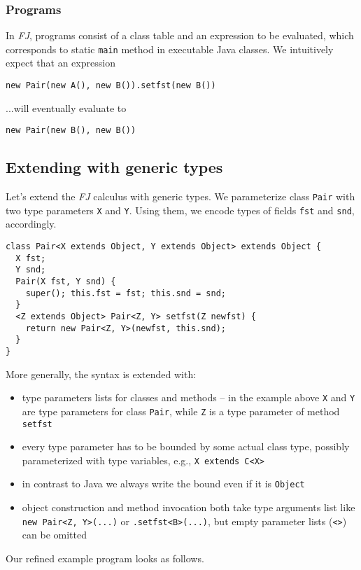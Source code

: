 \documentclass{article}[12pt]
\begin{document}
\subsubsection{Programs}

In \emph{FJ}, programs consist of a class table and an expression
to be evaluated, which corresponds to static \texttt{main} method in
executable Java classes. We intuitively expect that an expression

\begin{verbatim}
new Pair(new A(), new B()).setfst(new B())
\end{verbatim}
...will eventually evaluate to
\begin{verbatim}
new Pair(new B(), new B())
\end{verbatim}


\subsection{Extending with generic types}

Let's extend the \emph{FJ} calculus with generic types. We parameterize
class \texttt{Pair} with two type parameters \texttt{X} and \texttt{Y}.
Using them, we encode types of fields \texttt{fst} and \texttt{snd},
accordingly.

\begin{verbatim}
class Pair<X extends Object, Y extends Object> extends Object {
  X fst;
  Y snd;
  Pair(X fst, Y snd) {
    super(); this.fst = fst; this.snd = snd;
  }
  <Z extends Object> Pair<Z, Y> setfst(Z newfst) {
    return new Pair<Z, Y>(newfst, this.snd);
  }
}
\end{verbatim}
More generally, the syntax is extended with:

\begin{itemize}
\item type parameters lists for classes and methods -- in the example
  above \texttt{X} and \texttt{Y} are type parameters for class
  \texttt{Pair}, while \texttt{Z} is a type parameter of method
  \texttt{setfst}
\item every type parameter has to be bounded by some actual class
  type, possibly parameterized with type variables, e.g.,
  \texttt{X extends C<X>}
\item in contrast to Java we always write the bound even if it
  is \texttt{Object}
\item object construction and method invocation both take
  type arguments list like \texttt{new Pair<Z, Y>(...)} or
  \texttt{.setfst<B>(...)}, but empty parameter lists (\texttt{<>})
  can be omitted
\end{itemize}
Our refined example program looks as follows.
\end{document}
